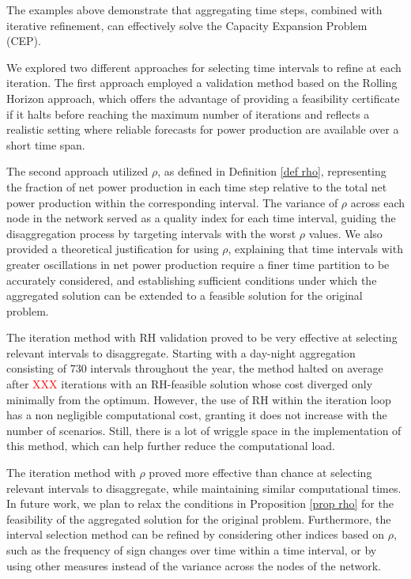 \documentclass[smallextended,natbib]{svjour3}       %
\numberwithin{definition}{section}
\numberwithin{theorem}{section}
\numberwithin{proposition}{section}
\begin{document}
The examples above demonstrate that aggregating time steps, combined with iterative refinement, can effectively solve the Capacity Expansion Problem (CEP). 

We explored two different approaches for selecting time intervals to refine at each iteration. The first approach employed a validation method based on the Rolling Horizon approach, which offers the advantage of providing a feasibility certificate if it halts before reaching the maximum number of iterations and reflects a realistic setting where reliable forecasts for power production are available over a short time span.

The second approach utilized \(\rho\), as defined in Definition \ref{def rho}, representing the fraction of net power production in each time step relative to the total net power production within the corresponding interval. 
The variance of \(\rho\) across each node in the network served as a quality index for each time interval, guiding the disaggregation process by targeting intervals with the worst \(\rho\) values. 
We also provided a theoretical justification for using \(\rho\), explaining that time intervals with greater oscillations in net power production require a finer time partition to be accurately considered, and establishing sufficient conditions under which the aggregated solution can be extended to a feasible solution for the original problem.

The iteration method with RH validation proved to be very effective at selecting relevant intervals to disaggregate. Starting with a day-night aggregation consisting of 730 intervals throughout the year, the method halted on average after \textcolor{red}{XXX} iterations with an RH-feasible solution whose cost diverged only minimally from the optimum.
However, the use of RH within the iteration loop has a non negligible computational cost, granting it does not increase with the number of scenarios. Still, there is a lot of wriggle space in the implementation of this method, which can help further reduce the computational load.

The iteration method with $\rho$ proved more effective than chance at selecting relevant intervals to disaggregate, while maintaining similar computational times.
In future work, we plan to relax the conditions in Proposition \ref{prop rho} for the feasibility of the aggregated solution for the original problem. Furthermore, the interval selection method can be refined by considering other indices based on \(\rho\), such as the frequency of sign changes over time within a time interval, or by using other measures instead of the variance across the nodes of the network.
\end{document}
